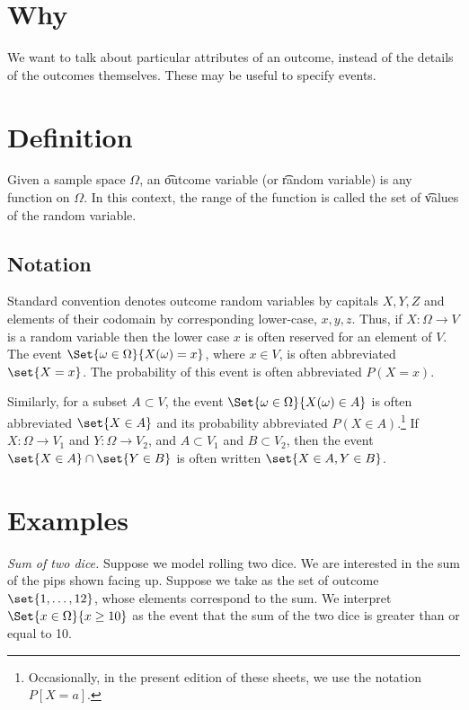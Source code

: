 
\section*{Why}

We want to talk about particular attributes of an outcome, instead of the details of the outcomes themselves.
These may be useful to specify events.

\section*{Definition}

Given a sample space $\Omega $, an \t{outcome variable} (or \t{random variable}) is any function on $\Omega $.
In this context, the range of the function is called the set of \t{values} of the random variable.

\subsection*{Notation}

Standard convention denotes outcome random variables by capitals $X, Y, Z$ and elements of their codomain by corresponding lower-case, $x, y, z$.
Thus, if $X: \Omega  \to V$ is a random variable then the lower case $x$ is often reserved for an element of $V$.
The event $\Set{\omega  \in \Omega }{X(\omega ) = x}$, where $x \in V$, is often abbreviated $\set{X = x}$.
The probability of this event is often abbreviated $P(X = x)$.

Similarly, for a subset $A \subset V$, the event $\Set{\omega \in \Omega }{X(\omega ) \in A}$ is often abbreviated $\set{X \in A}$ and its probability abbreviated $P(X \in A)$.\footnote{Occasionally, in the present edition of these sheets, we use the notation $P[X = a]$.}
If $X: \Omega  \to V_1$ and $Y: \Omega  \to V_2$, and $A \subset V_1$ and $B \subset V_2$, then the event $\set{X \in A} \cap  \set{Y \in B}$ is often written $\set{X \in A, Y \in B}$.

\section*{Examples}

\textit{Sum of two dice.}
Suppose we model rolling two dice.
We are interested in the sum of the pips shown facing up.
Suppose we take as the set of outcome $\set{1, \dots , 12}$, whose elements correspond to the sum.
We interpret $\Set{x \in \Omega }{x \geq 10}$ as the event that the sum of the two dice is greater than or equal to 10.

